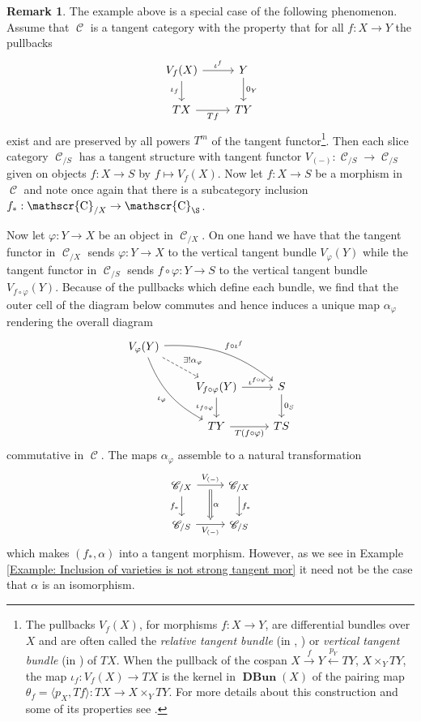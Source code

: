 \documentclass{amsart}
\theoremstyle{definition}
\newtheorem{remark}[equation]{Remark}
\DeclareMathOperator{\Cscr}{\mathscr{C}}
\DeclareMathOperator{\DBun}{\mathbf{DBun}}
\numberwithin{equation}{subsection}
\begin{document}
\begin{remark}\label{Remark: Vertical tan structure}
	The example above is a special case of the following phenomenon. Assume that $\Cscr$ is a tangent category with the property that for all $f:X \to Y$ the pullbacks
	\[
	\begin{tikzcd}
		V_f(X) \ar[r]{}{\iota^f} \ar[d, swap]{}{\iota_f} & Y \ar[d]{}{0_Y} \\
		TX \ar[r, swap]{}{Tf} & TY
	\end{tikzcd}
	\]
	exist and are preserved by all powers $T^m$ of the tangent functor\footnote{The pullbacks $V_{f}(X)$, for morphisms $f:X \to Y$, are differential bundles over $X$ and are often called the \emph{relative tangent bundle} (in \cite{GeoffJSDiffBunComAlg}, \cite{JSMeMapFlavoursInTanCats}) or \emph{vertical tangent bundle} (in \cite{PronkVooys}) of $TX$. When the pullback of the cospan $X \xrightarrow{f} Y \xleftarrow{p_Y} TY$, $X \times_Y TY$, the map $\iota_f:V_f(X) \to TX$ is the kernel in $\DBun(X)$ of the pairing map $\theta_f = \langle p_X,Tf\rangle:TX \to X \times_Y TY$. For more details about this construction and some of its properties see \cite{JSMeMapFlavoursInTanCats}.}. Then each slice category $\Cscr_{/S}$ has a tangent structure with tangent functor $V_{(-)}:\Cscr_{/S} \to \Cscr_{/S}$ given on objects $f:X \to S$ by $f \mapsto V_{f}(X)$. Now let $f:X \to S$ be a morphism in $\Cscr$ and note once again that there is a subcategory inclusion $f_{\ast}:\Cscr_{/X} \to \Cscr_{\S}$. 
	
	Now let $\varphi:Y \to X$ be an object in $\Cscr_{/X}$. On one hand we have that the tangent functor in $\Cscr_{/X}$ sends $\varphi:Y \to X$ to the vertical tangent bundle $V_{\varphi}(Y)$ while the tangent functor in $\Cscr_{/S}$ sends $f \circ \varphi:Y \to S$ to the vertical tangent bundle $V_{f \circ \varphi}(Y)$. Because of the pullbacks which define each bundle, we find that the outer cell of the diagram below commutes and hence induces a unique map $\alpha_{\varphi}$ rendering the overall diagram
	\[
	\begin{tikzcd}
		V_{\varphi}(Y) \ar[drr, bend left = 20]{}{f \circ \iota^{f}} \ar[ddr, swap, bend right = 20]{}{\iota_{\varphi}} \ar[dr, dashed]{}{\exists!\alpha_{\varphi}} \\
		& V_{f \circ \varphi}(Y) \ar[r]{}{\iota^{f \circ \varphi}} \ar[d, swap]{}{\iota_{f \circ \varphi}} & S \ar[d]{}{0_S} \\
		& TY \ar[r, swap]{}{T(f \circ \varphi)} & TS
	\end{tikzcd}
	\]
	commutative in $\Cscr$. The maps $\alpha_{\varphi}$ assemble to a natural transformation
	\[
	\begin{tikzcd}
		\Cscr_{/X} \ar[r, ""{name = U}]{}{V_{(-)}} \ar[d, swap]{}{f_{\ast}} & \Cscr_{/X} \ar[d]{}{f_{\ast}} \\
		\Cscr_{/S} \ar[r, swap, ""{name = D}]{}{V_{(-)}} & \Cscr_{/S}
		\ar[from = U, to = D, Rightarrow, shorten <= 4pt, shorten >= 4pt]{}{\alpha}
	\end{tikzcd}
	\]
	which makes $(f_{\ast},\alpha)$ into a tangent morphism. However, as we see in Example \ref{Example: Inclusion of varieties is not strong tangent mor} it need not be the case that $\alpha$ is an isomorphism.
\end{remark}
\end{document}
